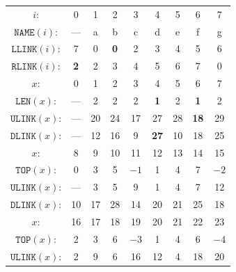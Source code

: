 \documentclass[a4paper,landscape,11pt]{article}
\begin{document}
\begin{figure}[H]
	\centering

	\begin{minipage}[t]{0.48\linewidth}
		\centering
		\begin{tabular}{c c c c c c c c c}
			\hline
			$i$:                 & 0          & 1  & 2          & 3          & 4           & 5  & 6           & 7    \\
			$\texttt{NAME}(i)$:  & ---        & a  & b          & c          & d           & e  & f           & g    \\
			$\texttt{LLINK}(i)$: & 7          & 0  & \textbf{0} & 2          & 3           & 4  & 5           & 6    \\
			$\texttt{RLINK}(i)$: & \textbf{2} & 2  & 3          & 4          & 5           & 6  & 7           & 0    \\
			\hline
			$x$:                 & 0          & 1  & 2          & 3          & 4           & 5  & 6           & 7    \\
			$\texttt{LEN}(x)$:   & ---        & 2  & 2          & 2          & \textbf{1}  & 2  & \textbf{1}  & 2    \\
			$\texttt{ULINK}(x)$: & ---        & 20 & 24         & 17         & 27          & 28 & \textbf{18} & 29   \\
			$\texttt{DLINK}(x)$: & ---        & 12 & 16         & 9          & \textbf{27} & 10 & 18          & 25   \\
			\hline
			$x$:                 & 8          & 9  & 10         & 11         & 12          & 13 & 14          & 15   \\
			$\texttt{TOP}(x)$:   & 0          & 3  & 5          & $-1$       & 1           & 4  & 7           & $-2$ \\
			$\texttt{ULINK}(x)$: & ---        & 3  & 5          & 9          & 1           & 4  & 7           & 12   \\
			$\texttt{DLINK}(x)$: & 10         & 17 & 28         & 14         & 20          & 21 & 25          & 18   \\
			\hline
			$x$:                 & 16         & 17 & 18         & 19         & 20          & 21 & 22          & 23   \\
			$\texttt{TOP}(x)$:   & 2          & 3  & 6          & $-3$       & 1           & 4  & 6           & $-4$ \\
			$\texttt{ULINK}(x)$: & 2          & 9  & 6          & 16         & 12          & 4  & 18          & 20   \\

\end{tabular}
\end{minipage}
\end{figure}
\end{document}
